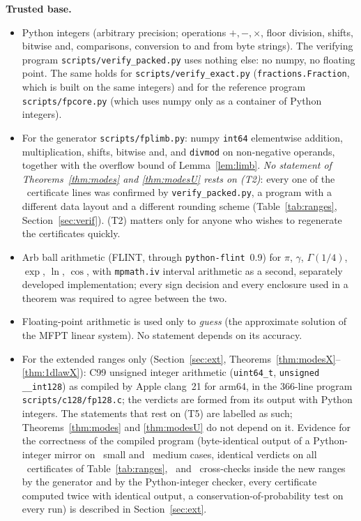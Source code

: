 \documentclass[11pt,a4paper]{article}
\theoremstyle{definition}
\theoremstyle{remark}
\begin{document}
\textbf{Trusted base.}
\begin{itemize}
\item[(T1)] Python integers (arbitrary precision; operations $+,-,\times$, floor division, shifts, bitwise and, comparisons, conversion to and from byte strings). The verifying program \texttt{scripts/verify\_packed.py} uses nothing else: no numpy, no floating point. The same holds for \texttt{scripts/verify\_exact.py} (\texttt{fractions.Fraction}, which is built on the same integers) and for the reference program \texttt{scripts/fpcore.py} (which uses numpy only as a container of Python integers).
\item[(T2)] For the generator \texttt{scripts/fplimb.py}: numpy \texttt{int64} elementwise addition, multiplication, shifts, bitwise and, and \texttt{divmod} on non-negative operands, together with the overflow bound of Lemma~\ref{lem:limb}. \emph{No statement of Theorems~\ref{thm:modes} and \ref{thm:modesU} rests on (T2)}: every one of the \TotalCerts\ certificate lines was confirmed by \texttt{verify\_packed.py}, a program with a different data layout and a different rounding scheme (Table~\ref{tab:ranges}, Section~\ref{sec:verif}). (T2) matters only for anyone who wishes to regenerate the certificates quickly.
\item[(T3)] Arb ball arithmetic (FLINT, through \texttt{python-flint}~0.9) for $\pi$, $\gamma$, $\Gamma(1/4)$, $\exp$, $\ln$, $\cos$, with \texttt{mpmath.iv} interval arithmetic as a second, separately developed implementation; every sign decision and every enclosure used in a theorem was required to agree between the two.
\item[(T4)] Floating-point arithmetic is used only to \emph{guess} (the approximate solution of the MFPT linear system). No statement depends on its accuracy.
\item[(T5)] For the extended ranges only (Section~\ref{sec:ext}, Theorems~\ref{thm:modesX}--\ref{thm:1dlawX}): C99 unsigned integer arithmetic (\texttt{uint64\_t}, \texttt{unsigned \_\_int128}) as compiled by Apple clang~21 for arm64, in the 366-line program \texttt{scripts/c128/fp128.c}; the verdicts are formed from its output with Python integers. The statements that rest on (T5) are labelled as such; Theorems~\ref{thm:modes} and \ref{thm:modesU} do not depend on it. Evidence for the correctness of the compiled program (byte-identical output of a Python-integer mirror on \XRefSmall\ small and \XRefMedium\ medium cases, identical verdicts on all \TotalCerts\ certificates of Table~\ref{tab:ranges}, \XXLimb\ and \XXPacked\ cross-checks inside the new ranges by the generator and by the Python-integer checker, every certificate computed twice with identical output, a conservation-of-probability test on every run) is described in Section~\ref{sec:ext}.
\end{itemize}
\end{document}
